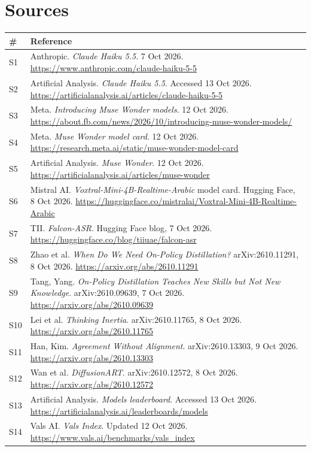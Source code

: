 \documentclass[11pt,a4paper]{article}
\begin{document}
\section{Sources}
{\footnotesize
\begin{tabularx}{\textwidth}{@{}l X@{}}
\toprule
\textbf{\#} & \textbf{Reference} \\
\midrule
S1  & Anthropic. \emph{Claude Haiku 5.5}. 7 Oct 2026. \url{https://www.anthropic.com/claude-haiku-5-5} \\
S2  & Artificial Analysis. \emph{Claude Haiku 5.5}. Accessed 13 Oct 2026. \url{https://artificialanalysis.ai/articles/claude-haiku-5-5} \\
S3  & Meta. \emph{Introducing Muse Wonder models}. 12 Oct 2026. \url{https://about.fb.com/news/2026/10/introducing-muse-wonder-models/} \\
S4  & Meta. \emph{Muse Wonder model card}. 12 Oct 2026. \url{https://research.meta.ai/static/muse-wonder-model-card} \\
S5  & Artificial Analysis. \emph{Muse Wonder}. 12 Oct 2026. \url{https://artificialanalysis.ai/articles/muse-wonder} \\
S6  & Mistral AI. \emph{Voxtral-Mini-4B-Realtime-Arabic} model card. Hugging Face, 8 Oct 2026. \url{https://huggingface.co/mistralai/Voxtral-Mini-4B-Realtime-Arabic} \\
S7  & TII. \emph{Falcon-ASR}. Hugging Face blog, 7 Oct 2026. \url{https://huggingface.co/blog/tiiuae/falcon-asr} \\
S8  & Zhao et al. \emph{When Do We Need On-Policy Distillation?} arXiv:2610.11291, 8 Oct 2026. \url{https://arxiv.org/abs/2610.11291} \\
S9  & Tang, Yang. \emph{On-Policy Distillation Teaches New Skills but Not New Knowledge}. arXiv:2610.09639, 7 Oct 2026. \url{https://arxiv.org/abs/2610.09639} \\
S10 & Lei et al. \emph{Thinking Inertia}. arXiv:2610.11765, 8 Oct 2026. \url{https://arxiv.org/abs/2610.11765} \\
S11 & Han, Kim. \emph{Agreement Without Alignment}. arXiv:2610.13303, 9 Oct 2026. \url{https://arxiv.org/abs/2610.13303} \\
S12 & Wan et al. \emph{DiffusionART}. arXiv:2610.12572, 8 Oct 2026. \url{https://arxiv.org/abs/2610.12572} \\
S13 & Artificial Analysis. \emph{Models leaderboard}. Accessed 13 Oct 2026. \url{https://artificialanalysis.ai/leaderboards/models} \\
S14 & Vals AI. \emph{Vals Index}. Updated 12 Oct 2026. \url{https://www.vals.ai/benchmarks/vals_index} \\

\end{tabularx}}
\end{document}
